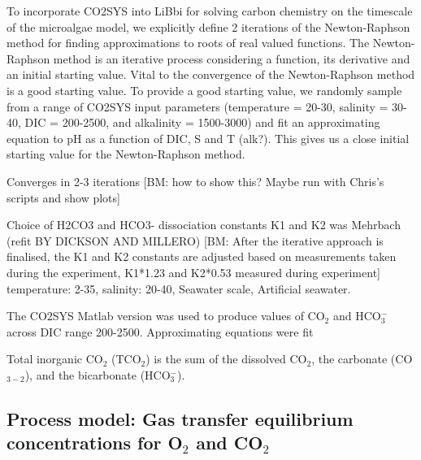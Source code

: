 \documentclass{ruthesis}
\begin{document}
To incorporate CO2SYS into LiBbi for solving carbon chemistry on the timescale of the microalgae model, we explicitly define 2 iterations of the Newton-Raphson method for finding approximations to roots of real valued functions. The Newton-Raphson method is an iterative process considering a function, its derivative and an initial starting value. Vital to the convergence of the Newton-Raphson method is a good starting value. To provide a good starting value, we randomly sample from a range of CO2SYS input parameters (temperature = 20-30, salinity = 30-40, DIC = 200-2500, and alkalinity = 1500-3000) and fit an approximating equation to pH as a function of DIC, S and T (alk?). This gives us a close initial starting value for the Newton-Raphson method. 

Converges in 2-3 iterations [BM: how to show this? Maybe run with Chris's scripts and show plots]



Choice of H2CO3 and HCO3- dissociation constants K1 and K2 was Mehrbach (refit BY DICKSON AND MILLERO) [BM: After the iterative approach is finalised, the K1 and K2 constants are adjusted based on measurements taken during the experiment, K1*1.23 and K2*0.53 measured during experiment] temperature: 2-35,  salinity: 20-40, Seawater scale, Artificial seawater.



The CO2SYS Matlab version \cite{van2011matlab} was used to produce values of CO$_2$ and HCO$_3^-$ across DIC range 200-2500. 
Approximating equations were fit


Total inorganic CO$_2$ (TCO$_2$) is the sum of the dissolved CO$_2$, the carbonate (CO$_{3-2}$), and the bicarbonate (HCO$_3^-$).




\subsection{Process model: Gas transfer equilibrium concentrations for O$_2$ and CO$_2$}


\end{document}
